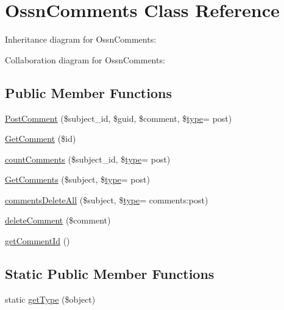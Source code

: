 \hypertarget{class_ossn_comments}{}\section{Ossn\+Comments Class Reference}
\label{class_ossn_comments}


Inheritance diagram for Ossn\+Comments\+:


Collaboration diagram for Ossn\+Comments\+:
\subsection*{Public Member Functions}
\begin{DoxyCompactItemize}
\item 
\hyperlink{class_ossn_comments_a13f8a2cef4315746650f0cdf5c4482ac}{Post\+Comment} (\$subject\+\_\+id, \$guid, \$comment, \$\hyperlink{_ossn_wall_2actions_2wall_2post_2group_8php_a2dc1bb4e1ed0029daa81ac0776b14b51}{type}= \textquotesingle{}post\textquotesingle{})
\item 
\hyperlink{class_ossn_comments_abe7fd5e160fed429e44043174e3bbdd3}{Get\+Comment} (\$id)
\item 
\hyperlink{class_ossn_comments_a2f10d2abbb7d182237bdf6787185123c}{count\+Comments} (\$subject\+\_\+id, \$\hyperlink{_ossn_wall_2actions_2wall_2post_2group_8php_a2dc1bb4e1ed0029daa81ac0776b14b51}{type}= \textquotesingle{}post\textquotesingle{})
\item 
\hyperlink{class_ossn_comments_a80b1f820b1d1d2a7b01c108bd6f558cd}{Get\+Comments} (\$subject, \$\hyperlink{_ossn_wall_2actions_2wall_2post_2group_8php_a2dc1bb4e1ed0029daa81ac0776b14b51}{type}= \textquotesingle{}post\textquotesingle{})
\item 
\hyperlink{class_ossn_comments_af07cf20e993816bbe79a706893d3fbeb}{comments\+Delete\+All} (\$subject, \$\hyperlink{_ossn_wall_2actions_2wall_2post_2group_8php_a2dc1bb4e1ed0029daa81ac0776b14b51}{type}= \textquotesingle{}comments\+:post\textquotesingle{})
\item 
\hyperlink{class_ossn_comments_a5e6d23edeade8f0f7442cef2d0841251}{delete\+Comment} (\$comment)
\item 
\hyperlink{class_ossn_comments_aeeb8d5147e17f9279f3aadd016383861}{get\+Comment\+Id} ()
\end{DoxyCompactItemize}
\subsection*{Static Public Member Functions}
\begin{DoxyCompactItemize}
\item 
static \hyperlink{class_ossn_comments_a83e87b3cee99a9cb950307d40062a10a}{get\+Type} (\$object)
\end{DoxyCompactItemize}


